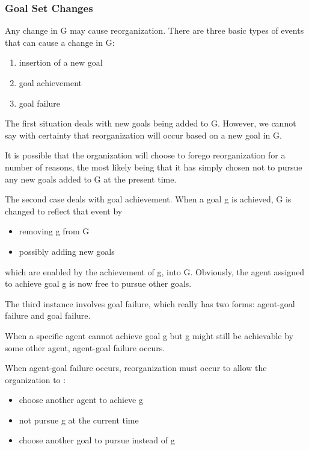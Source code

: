 \subsubsection{Goal Set Changes}
Any change in G may cause reorganization. There are three basic types 
of events that can cause a change in G: 
\begin{enumerate}
\item   insertion of a new goal  
\item   goal achievement 
\item   goal failure
\end{enumerate}

The first situation deals with new goals being added to G. However, \cite{omacs2}
we cannot say with certainty that reorganization will occur based on a new goal in G. 

It is possible that the organization will choose to forego reorganization for a number of reasons, the most likely being that it has simply chosen not to pursue any new goals added to G at the present time.

The second case deals with goal achievement. When a goal g is achieved, G is changed to reflect that event by 

\begin{itemize}
\newcommand{\localtextbulletone}{\textcolor{gray}{\raisebox{.45ex}{\rule{.6ex}{.6ex}}}}
\renewcommand{\labelitemi}{\localtextbulletone}
\item  removing g from G
\item  possibly adding new goals
\end{itemize}	

 which are enabled by the achievement of g, into G. Obviously, the agent assigned to achieve goal g is now free to pursue other goals. 

The third instance involves goal failure, which really has two forms: agent-goal failure and goal failure.

When a specific agent cannot achieve goal g but g might still be achievable by some other agent, 
agent-goal failure occurs. 

When agent-goal failure occurs, reorganization must occur to allow the organization to :

\begin{itemize}
\newcommand{\localtextbulletone}{\textcolor{gray}{\raisebox{.45ex}{\rule{.6ex}{.6ex}}}}
\renewcommand{\labelitemi}{\localtextbulletone}
\item  choose another agent to achieve g
\item  not pursue g at the current time
\item  choose another goal to pursue instead of g
\end{itemize}	
 

